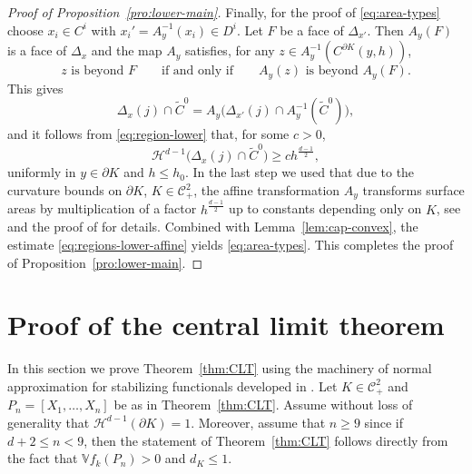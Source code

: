 \documentclass[12pt]{article}
\def\V{{\mathds V}}
\def\cC{{\mathcal C}}
\def\cH{{\mathcal H}}
\def\bd{{\partial}}
\theoremstyle{definition}
\begin{document}
\begin{proof}[Proof of Proposition~\ref{pro:lower-main}]
Finally, for the proof of \eqref{eq:area-types} choose $x_i\in C^i$ with $x_i'=A_y^{-1}(x_i)\in D^i$. Let $F$ be a face of $\Delta_{x'}$. Then $A_y(F)$ is a face of $\Delta_{x}$ and the map $A_y$ satisfies, for any $z\in A_y^{-1}(C^{\partial K}(y,h))$,
\[
z \text{ is beyond } F \qquad \text{if and only if}\qquad A_y(z) \text{ is beyond }A_y(F).
\]
This gives
\[
\Delta_{x}(j)\cap \tilde{C}^{0}
=A_y\big(\Delta_{x'}(j)\cap A_y^{-1}(\tilde{C}^{0})\big),
\]
and it follows from \eqref{eq:region-lower} that, for some $c>0$,
\begin{equation} \label{eq:regions-lower-affine}
	\cH^{d-1}\big(\Delta_{x}(j)\cap \tilde{C}^{0}\big)
\ge c h^{\frac{d-1}{2}},
\end{equation}
uniformly in $y\in \partial K$ and $h\le h_0$. In the last step we used that due to the curvature bounds on $\partial K$, $ K \in \cC^2_+$, the affine transformation $A_y$ transforms surface areas by multiplication of a factor $h^{\frac{d-1}{2}}$ up to constants depending only on $K$, see \cite[Section~3.1]{TuWe} and the proof of \cite[Lemma~6.2]{RVW08} for details. Combined with Lemma~\ref{lem:cap-convex}, the estimate \eqref{eq:regions-lower-affine} yields \eqref{eq:area-types}. This completes the proof of Proposition~\ref{pro:lower-main}.
\end{proof}

\section{Proof of the central limit theorem}\label{sec:clt}

In this section we prove Theorem~\ref{thm:CLT} using the machinery of normal approximation for stabilizing functionals developed in \cite{LachSchulteYukich}. Let $K\in \cC^2_+$ and $P_n=[X_1,\dots,X_n]$ be as in Theorem~\ref{thm:CLT}. Assume without loss of generality that $\cH^{d-1}(\bd K)=1$. Moreover, assume that $n\ge 9$ since if $d+2\le n< 9$, then the statement of Theorem~\ref{thm:CLT} follows directly from the fact that $\V f_k(P_n)>0$ and $d_K\le 1$.
\end{document}
